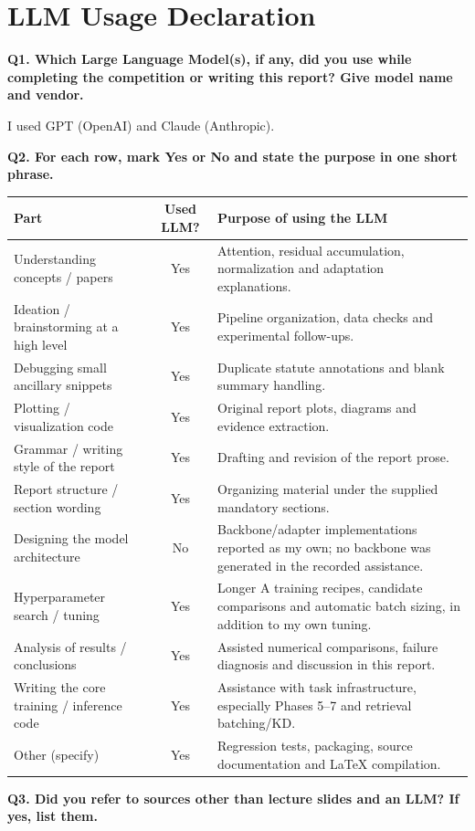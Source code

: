 \section*{LLM Usage Declaration}
\noindent\textbf{Q1. Which Large Language Model(s), if any, did you use while completing the competition
or writing this report? Give model name and vendor.}

I used GPT (OpenAI) and Claude (Anthropic).

\medskip\noindent\textbf{Q2. For each row, mark Yes or No and state the purpose in one short phrase.}
\begin{table}[H]\centering\small
\begin{tabularx}{\textwidth}{>{\raggedright\arraybackslash}p{4.0cm}cX}
\toprule Part & Used LLM? & Purpose of using the LLM\\\midrule
Understanding concepts / papers & Yes & Attention, residual accumulation, normalization and adaptation explanations.\\
Ideation / brainstorming at a high level & Yes & Pipeline organization, data checks and experimental follow-ups.\\
Debugging small ancillary snippets & Yes & Duplicate statute annotations and blank summary handling.\\
Plotting / visualization code & Yes & Original report plots, diagrams and evidence extraction.\\
Grammar / writing style of the report & Yes & Drafting and revision of the report prose.\\
Report structure / section wording & Yes & Organizing material under the supplied mandatory sections.\\
Designing the model architecture & No & Backbone/adapter implementations reported as my own; no backbone was generated in the recorded assistance.\\
Hyperparameter search / tuning & Yes & Longer A training recipes, candidate comparisons and automatic batch sizing, in addition to my own tuning.\\
Analysis of results / conclusions & Yes & Assisted numerical comparisons, failure diagnosis and discussion in this report.\\
Writing the core training / inference code & Yes & Assistance with task infrastructure, especially Phases 5--7 and retrieval batching/KD.\\
Other (specify) & Yes & Regression tests, packaging, source documentation and LaTeX compilation.\\\bottomrule
\end{tabularx}
\end{table}
\medskip\noindent\textbf{Q3. Did you refer to sources other than lecture slides and an LLM? If yes,
list them.}

